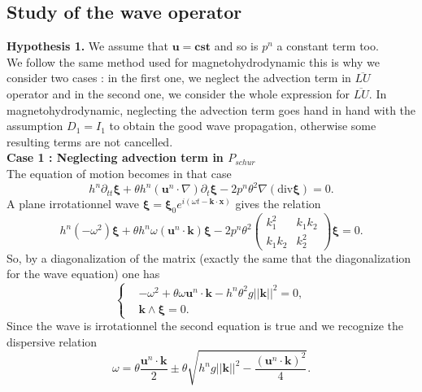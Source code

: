 \documentclass[a4paper, 11pt]{report}
\begin{document}
\subsection{Study of the wave operator }


\textbf{Hypothesis 1.} We assume that $\boldsymbol{u}=\boldsymbol{cst}$ and so is $p^n$ a constant term too.\\ 

We follow the same method used for magnetohydrodynamic this is why we consider two cases : in the first one, we neglect the advection term in $\overline{LU}$ operator and in the second one, we consider the whole expression for $\overline{LU}$. In magnetohydrodynamic, neglecting the advection term goes hand in hand with the assumption $D_1=I_1$ to obtain the good wave propagation, otherwise some resulting terms are not cancelled.\\
\textbf{Case 1 : Neglecting advection term in $P_{schur}$}\\
The equation of motion becomes in that case
\begin{equation*}
h^n\partial_{tt}\boldsymbol{\xi}+\theta h^n\left(\boldsymbol{u}^n\cdot \nabla \right)\partial_t\boldsymbol{\xi}-2p^n\theta^2\nabla(\text{div}\boldsymbol{\xi})=0.
\end{equation*}
A plane irrotationnel wave $\boldsymbol{\xi}=\boldsymbol{\xi}_0e^{i(\omega t-\boldsymbol{k}\cdot \boldsymbol{x})} $ gives the relation
\begin{equation*}
h^n(-\omega^2)\boldsymbol{\xi}+\theta h^n\omega (\boldsymbol{u}^n\cdot \boldsymbol{k})\boldsymbol{\xi}-2p^n\theta^2\begin{pmatrix}k_1^2&k_1k_2\\
k_1k_2&k_2^2\end{pmatrix}\boldsymbol{\xi}=0.
\end{equation*}
So, by a diagonalization of the matrix (exactly the same that the diagonalization for the wave equation) one has
\begin{equation*}
\left\{
\begin{split}
&-\omega^2+\theta \omega \boldsymbol{u}^n\cdot \boldsymbol{k}-h^n\theta^2g||\boldsymbol{k}||^2=0,\\
&\boldsymbol{k}\wedge\boldsymbol{\xi}=0.
\end{split}
\right.
\end{equation*}
Since the wave is irrotationnel the second equation is true and we recognize the dispersive relation
\begin{equation*}
\omega =\theta\frac{\boldsymbol{u}^n\cdot \boldsymbol{k}}{2}\pm\theta\sqrt{h^ng||\boldsymbol{k}||^2-\frac{(\boldsymbol{u}^n\cdot \boldsymbol{k})^2}{4}}.
\end{equation*}
\end{document}
